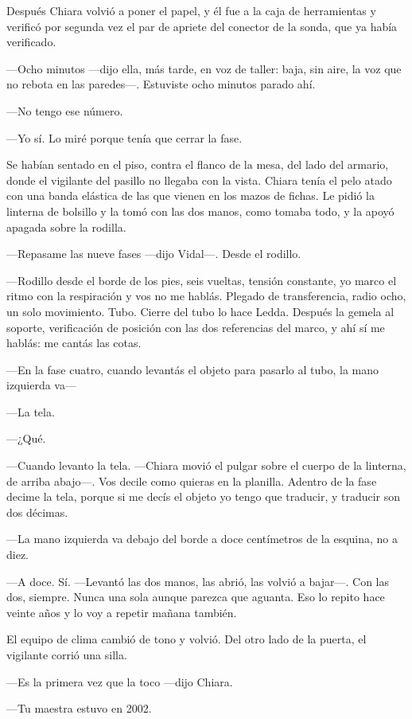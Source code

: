 Después Chiara volvió a poner el papel, y él fue a la caja de herramientas y verificó por segunda vez el par de apriete del conector de la sonda, que ya había verificado.

---Ocho minutos ---dijo ella, más tarde, en voz de taller: baja, sin aire, la voz que no rebota en las paredes---. Estuviste ocho minutos parado ahí.

---No tengo ese número.

---Yo sí. Lo miré porque tenía que cerrar la fase.

Se habían sentado en el piso, contra el flanco de la mesa, del lado del armario, donde el vigilante del pasillo no llegaba con la vista. Chiara tenía el pelo atado con una banda elástica de las que vienen en los mazos de fichas. Le pidió la linterna de bolsillo y la tomó con las dos manos, como tomaba todo, y la apoyó apagada sobre la rodilla.

---Repasame las nueve fases ---dijo Vidal---. Desde el rodillo.

---Rodillo desde el borde de los pies, seis vueltas, tensión constante, yo marco el ritmo con la respiración y vos no me hablás. Plegado de transferencia, radio ocho, un solo movimiento. Tubo. Cierre del tubo lo hace Ledda. Después la gemela al soporte, verificación de posición con las dos referencias del marco, y ahí sí me hablás: me cantás las cotas.

---En la fase cuatro, cuando levantás el objeto para pasarlo al tubo, la mano izquierda va---

---La tela.

---¿Qué.

---Cuando levanto la tela. ---Chiara movió el pulgar sobre el cuerpo de la linterna, de arriba abajo---. Vos decile como quieras en la planilla. Adentro de la fase decime la tela, porque si me decís el objeto yo tengo que traducir, y traducir son dos décimas.

---La mano izquierda va debajo del borde a doce centímetros de la esquina, no a diez.

---A doce. Sí. ---Levantó las dos manos, las abrió, las volvió a bajar---. Con las dos, siempre. Nunca una sola aunque parezca que aguanta. Eso lo repito hace veinte años y lo voy a repetir mañana también.

El equipo de clima cambió de tono y volvió. Del otro lado de la puerta, el vigilante corrió una silla.

---Es la primera vez que la toco ---dijo Chiara.

---Tu maestra estuvo en 2002.

